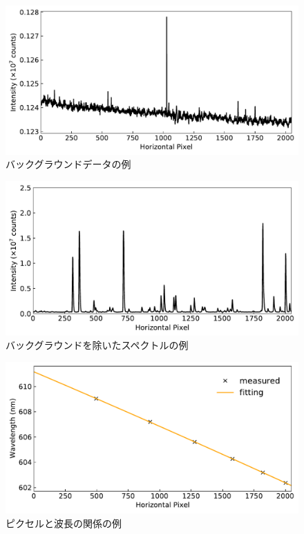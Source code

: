 \begin{figure}
    \centering
    \includegraphics[width=15cm]{pictures/back-spectrum-example.pdf}
    \caption{バックグラウンドデータの例}
    \label{fig:back-spectrum-example}
\end{figure}

\begin{figure}
    \centering
    \includegraphics[width=15cm]{pictures/true-spectrum-example.pdf}
    \caption{バックグラウンドを除いたスペクトルの例}
    \label{fig:true-spectrum-example}
\end{figure}

\begin{figure}
    \centering
    \includegraphics[width=15cm]{pictures/pixel-to-wavelength.pdf}
    \caption{ピクセルと波長の関係の例}
    \label{fig:pixel-to-wavelength}
\end{figure}

